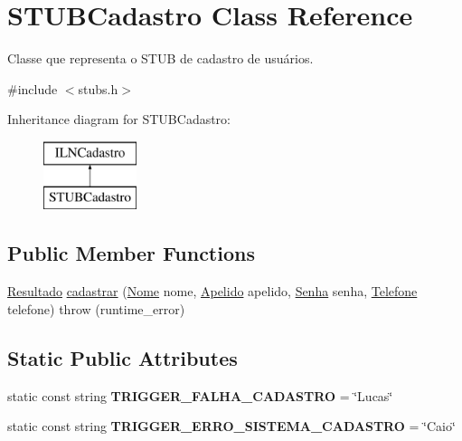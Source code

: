 \hypertarget{classSTUBCadastro}{}\section{S\+T\+U\+B\+Cadastro Class Reference}
\label{classSTUBCadastro}


Classe que representa o S\+T\+UB de cadastro de usuários.  




{\ttfamily \#include $<$stubs.\+h$>$}

Inheritance diagram for S\+T\+U\+B\+Cadastro\+:\begin{figure}[H]
\begin{center}
\leavevmode
\includegraphics[height=2.000000cm]{classSTUBCadastro}
\end{center}
\end{figure}
\subsection*{Public Member Functions}
\begin{DoxyCompactItemize}
\item 
\hyperlink{classResultado}{Resultado} \hyperlink{classSTUBCadastro_a030d1572eee2691495fc4401c052d99b}{cadastrar} (\hyperlink{classNome}{Nome} nome, \hyperlink{classApelido}{Apelido} apelido, \hyperlink{classSenha}{Senha} senha, \hyperlink{classTelefone}{Telefone} telefone)  throw (runtime\+\_\+error)
\end{DoxyCompactItemize}
\subsection*{Static Public Attributes}
\begin{DoxyCompactItemize}
\item 
\mbox{\label{classSTUBCadastro_a4cb2c182b8e8637adff931bd593dfca3}} 
static const string {\bfseries T\+R\+I\+G\+G\+E\+R\+\_\+\+F\+A\+L\+H\+A\+\_\+\+C\+A\+D\+A\+S\+T\+RO} = \char`\"{}Lucas\char`\"{}
\item 
\mbox{\label{classSTUBCadastro_aced27b1215db103532d8ec4418e57ffb}} 
static const string {\bfseries T\+R\+I\+G\+G\+E\+R\+\_\+\+E\+R\+R\+O\+\_\+\+S\+I\+S\+T\+E\+M\+A\+\_\+\+C\+A\+D\+A\+S\+T\+RO} = \char`\"{}Caio\char`\"{}
\end{DoxyCompactItemize}


